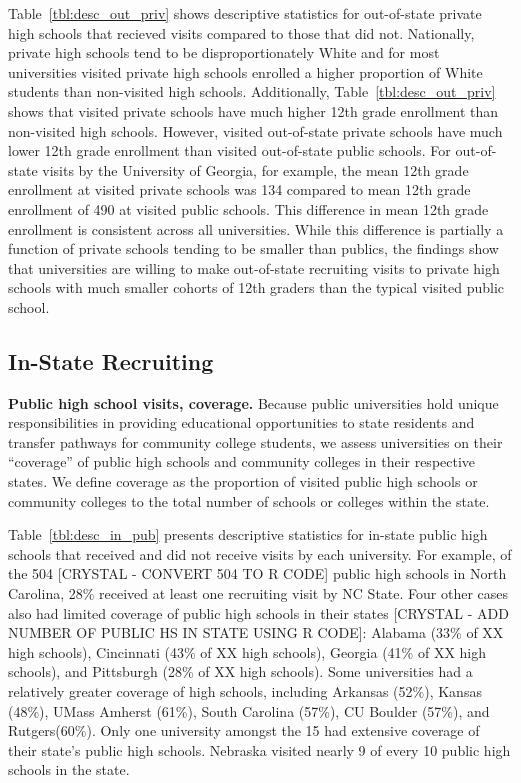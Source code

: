 \documentclass[twoside]{article}
\begin{document}
Table~\ref{tbl:desc_out_priv} shows descriptive statistics for out-of-state private high schools that recieved visits compared to those that did not. Nationally, private high schools tend to be disproportionately White and for most universities visited private high schools enrolled a higher proportion of White students than non-visited high schools. Additionally, Table~\ref{tbl:desc_out_priv} shows that visited private schools have much higher 12th grade enrollment than non-visited high schools. However, visited out-of-state private schools have much lower 12th grade enrollment than visited out-of-state public schools. For out-of-state visits by the University of Georgia, for example, the mean 12th grade enrollment at visited private schools was 134 compared to mean 12th grade enrollment of 490 at visited public schools. This difference in mean 12th grade enrollment is consistent across all universities. While this difference is partially a function of private schools tending to be smaller than publics, the findings show that universities are willing to make out-of-state recruiting visits to private high schools with much smaller cohorts of 12th graders than the typical visited public school.

\subsection*{In-State Recruiting}

\textbf{Public high school visits, coverage.} Because public universities hold unique responsibilities in providing educational opportunities to state residents and transfer pathways for community college students, we assess universities on their ``coverage'' of public high schools and community colleges in their respective states. We define coverage as the proportion of visited public high schools or community colleges to the total number of schools or colleges within the state.

Table~\ref{tbl:desc_in_pub} presents descriptive statistics for in-state public high schools that received and did not receive visits by each university. For example, of the 504 [CRYSTAL - CONVERT 504 TO R CODE] public high schools in North Carolina, 28\% received at least one recruiting visit by NC State.  Four other cases also had limited coverage of public high schools in their states [CRYSTAL - ADD NUMBER OF PUBLIC HS IN STATE USING R CODE]: Alabama (33\% of XX high schools), Cincinnati (43\% of XX high schools), Georgia (41\% of XX high schools), and Pittsburgh (28\% of XX high schools). Some universities had a relatively greater coverage of high schools, including Arkansas (52\%), Kansas (48\%), UMass Amherst (61\%), South Carolina (57\%), CU Boulder (57\%), and Rutgers(60\%). Only one university amongst the 15 had extensive coverage of their state’s public high schools. Nebraska visited nearly 9 of every 10 public high schools in the state.
\end{document}
